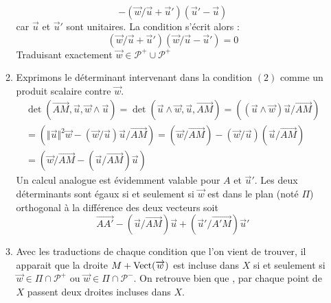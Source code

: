 \begin{enumerate}
\begin{enumerate}
\begin{displaymath}
-
\left( \overrightarrow w / \overrightarrow u + \overrightarrow u'\right)(\overrightarrow u' - \overrightarrow u) 
\end{displaymath}
car $\overrightarrow u$ et $\overrightarrow u'$ sont unitaires. La condition s'écrit alors :
\begin{displaymath}
 \left( \overrightarrow w / \overrightarrow u + \overrightarrow u'\right) 
\left( \overrightarrow w / \overrightarrow u - \overrightarrow u'\right) = 0
\end{displaymath}
Traduisant exactement $\overrightarrow w\in \mathcal P^+ \cup \mathcal P^+$
\item Exprimons le déterminant intervenant dans la condition $(2)$ comme un produit scalaire contre $\overrightarrow w$.
\begin{multline*}
 \det(\overrightarrow{AM},\overrightarrow u , \overrightarrow w \wedge \overrightarrow u)
= \det(\overrightarrow u \wedge \overrightarrow w , \overrightarrow u ,\overrightarrow{AM}) 
= \left( (\overrightarrow u \wedge \overrightarrow w)\overrightarrow u/ \overrightarrow{AM}\right) \\
=\left(
\Vert \overrightarrow u\Vert^2\overrightarrow w-(\overrightarrow w/\overrightarrow u)\overrightarrow u 
/
\overrightarrow{AM}
\right) 
=(\overrightarrow w / \overrightarrow{AM})- (\overrightarrow w/\overrightarrow u) (\overrightarrow u/\overrightarrow{AM}) \\
= \left( 
\overrightarrow w
/
\overrightarrow{AM} -(\overrightarrow u/\overrightarrow{AM})\overrightarrow u
\right) 
\end{multline*}
Un calcul analogue est évidemment valable pour $A$ et $\overrightarrow u'$. Les deux déterminants sont égaux si et seulement si $\overrightarrow w$ est dans le plan (noté $\Pi$) orthogonal à la différence des deux vecteurs soit
\begin{displaymath}
 \overrightarrow{AA'}-(\overrightarrow u / \overrightarrow{AM})\overrightarrow u
                     +(\overrightarrow u' / \overrightarrow{A'M})\overrightarrow u'
\end{displaymath}

\item Avec les traductions de chaque condition que l'on vient de trouver, il apparait que la droite $M+\operatorname{Vect}(\overrightarrow w)$ est incluse dans $X$ si et seulement si $\overrightarrow w \in \Pi \cap \mathcal P^+$ ou $\overrightarrow w \in \Pi \cap \mathcal P^-$. On retrouve bien que , par chaque point de $X$ passent deux droites incluses dans $X$.
\end{enumerate}

\end{enumerate}
